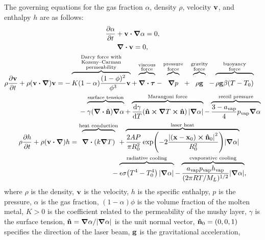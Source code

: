\documentclass{article}
\newcommand{\evapor}[1]{{#1}_\mathrm{vap}}
\newcommand{\bv}{\vb{v}}
\newcommand{\bn}{\vu{n}}
\newcommand{\bx}{\vb{x}}
\newcommand{\btau}{\vb*\tau}
\begin{document}
The governing equations for the gas fraction $\alpha$, density $\rho$, velocity $\bv$, and enthalpy $h$ are as follows:
\begin{gather}
    \pdv{\alpha}{t} + \bv\vdot\grad\alpha = 0, \label{eq:alpha}\\
    \div\bv = 0, \label{eq:continuity}\\
    \begin{multlined}
    \rho\pdv{\bv}{t} + \rho(\bv\vdot\grad)\bv =
        - \myoverbrace{K(1-\alpha)\frac{(1-\phi)^2}{\phi^3}\bv}
            {Darcy force with\\Kozeny--Carman\\permeability}
        + \myoverbrace{\div\btau}{viscous\\force}
        - \myoverbrace{\grad{p}}{pressure\\force}
        + \myoverbrace{\rho\vb{g}}{gravity\\force}
        - \myoverbrace{\rho\vb{g}\beta(T-T_0)}{buoyancy\\force}\\
        - \myoverbrace{\gamma\qty(\div\bn)\grad\alpha}{surface tension}
        + \myoverbrace{\dv{\gamma}{T}\qty(\bn\cp\grad{T}\cp\bn)|\grad\alpha|}{Marangoni force}
        -\myoverbrace{\frac{3-\evapor{a}}4\evapor{p}\grad\alpha}{recoil pressure}
    \end{multlined}\label{eq:v}\\
    \begin{multlined}
    \rho\pdv{h}{t} + \rho(\bv\vdot\grad)h
        = \myoverbrace[\qty(\frac12)^2]{\div(k\grad{T})}{heat conduction}
        + \myoverbrace{\frac{2AP}{\pi R_0^2}
            \exp(-2\frac{\qty|(\bx-\bx_0)\cp\bn_0|^2}{R_0^2})|\grad\alpha|}{laser heat}\\
        - \myoverbrace{\epsilon\sigma\qty(T^4-T_0^4)|\grad\alpha|}{radiative cooling}
        - \myoverbrace{\frac{\evapor{a}\evapor{p}\evapor{h}}
            {(2\pi RT/M_L)^{1/2}}|\grad\alpha|}{evaporative cooling},
    \end{multlined}\label{eq:h}
\end{gather}
where $\rho$ is the density, $\bv$ is the velocity, $h$ is the specific enthalpy,
$p$ is the pressure, $\alpha$ is the gas fraction,
$(1-\alpha)\phi$ is the volume fraction of the molten metal,
$K>0$ is the coefficient related to the permeability of the mushy layer,
$\gamma$ is the surface tension,
$\bn = \grad\alpha/|\grad\alpha|$ is the unit normal vector,
$\bn_0 = (0,0,1)$ specifies the direction of the laser beam,
$\vb{g}$ is the gravitational acceleration,
\end{document}
